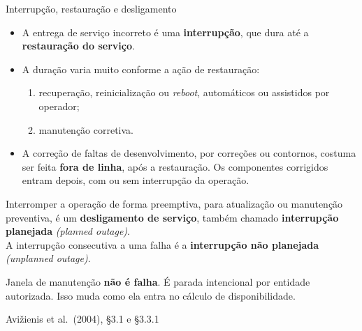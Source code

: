 \documentclass{beamer}
\newcommand{\en}[1]{{\color{depCinza}\textit{#1}}}
\newcommand{\sect}[1]{\par\smallskip\hfill{\tiny\color{black!55}Avi\v{z}ienis et al.\ (2004), #1}}
\begin{document}
\begin{frame}{Interrup\c{c}\~ao, restaura\c{c}\~ao e desligamento}
    \footnotesize
    \begin{itemize}
        \item A entrega de servi\c{c}o incorreto \'e uma \textbf{interrup\c{c}\~ao}, que dura at\'e a \textbf{restaura\c{c}\~ao do servi\c{c}o}.
        \item A dura\c{c}\~ao varia muito conforme a a\c{c}\~ao de restaura\c{c}\~ao:
        \begin{enumerate}
            \item recupera\c{c}\~ao, reinicializa\c{c}\~ao ou \textit{reboot}, autom\'aticos ou assistidos por operador;
            \item manuten\c{c}\~ao corretiva.
        \end{enumerate}
        \item A corre\c{c}\~ao de faltas de desenvolvimento, por corre\c{c}\~oes ou contornos, costuma ser feita \textbf{fora de linha}, ap\'os a restaura\c{c}\~ao. Os componentes corrigidos entram depois, com ou sem interrupção da opera\c{c}\~ao.
    \end{itemize}
    \medskip
    \begin{defi}
        \scriptsize
        Interromper a opera\c{c}\~ao de forma preemptiva, para atualiza\c{c}\~ao ou manuten\c{c}\~ao preventiva, \'e um \textbf{desligamento de servi\c{c}o}, tamb\'em chamado \textbf{interrup\c{c}\~ao planejada} \en{(planned outage)}.\\[3pt]
        A interrup\c{c}\~ao consecutiva a uma falha \'e a \textbf{interrup\c{c}\~ao n\~ao planejada} \en{(unplanned outage)}.
    \end{defi}
    \medskip
    \begin{ancora}
        \footnotesize
        Janela de manuten\c{c}\~ao \textbf{n\~ao \'e falha}. \'E parada intencional por entidade autorizada. Isso muda como ela entra no c\'alculo de disponibilidade.
    \end{ancora}
    \sect{\S3.1 e \S3.3.1}
\end{frame}
\end{document}
